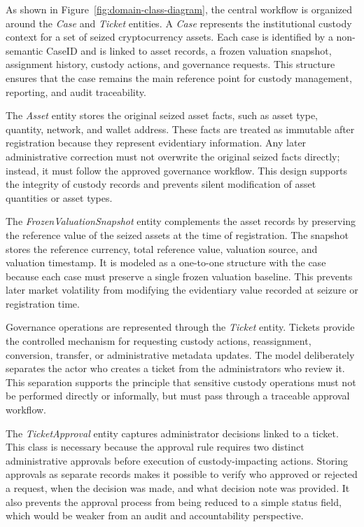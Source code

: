 \documentclass[12pt,a4paper]{report}
\begin{document}
As shown in Figure~\ref{fig:domain-class-diagram}, the central workflow is organized
around the \textit{Case} and \textit{Ticket} entities. A \textit{Case} represents the
institutional custody context for a set of seized cryptocurrency assets. Each case is
identified by a non-semantic CaseID and is linked to asset records, a frozen valuation
snapshot, assignment history, custody actions, and governance requests. This structure
ensures that the case remains the main reference point for custody management, reporting,
and audit traceability.

The \textit{Asset} entity stores the original seized asset facts, such as asset type,
quantity, network, and wallet address. These facts are treated as immutable after
registration because they represent evidentiary information. Any later administrative
correction must not overwrite the original seized facts directly; instead, it must follow
the approved governance workflow. This design supports the integrity of custody records
and prevents silent modification of asset quantities or asset types.

The \textit{FrozenValuationSnapshot} entity complements the asset records by preserving
the reference value of the seized assets at the time of registration. The snapshot stores
the reference currency, total reference value, valuation source, and valuation timestamp.
It is modeled as a one-to-one structure with the case because each case must preserve a
single frozen valuation baseline. This prevents later market volatility from modifying the
evidentiary value recorded at seizure or registration time.


Governance operations are represented through the \textit{Ticket} entity. Tickets provide
the controlled mechanism for requesting custody actions, reassignment, conversion,
transfer, or administrative metadata updates. The model deliberately separates the actor
who creates a ticket from the administrators who review it. This separation supports the
principle that sensitive custody operations must not be performed directly or informally,
but must pass through a traceable approval workflow.

The \textit{TicketApproval} entity captures administrator decisions linked to a ticket.
This class is necessary because the approval rule requires two distinct administrative
approvals before execution of custody-impacting actions. Storing approvals as separate
records makes it possible to verify who approved or rejected a request, when the decision
was made, and what decision note was provided. It also prevents the approval process
from being reduced to a simple status field, which would be weaker from an audit and
accountability perspective.
\end{document}
